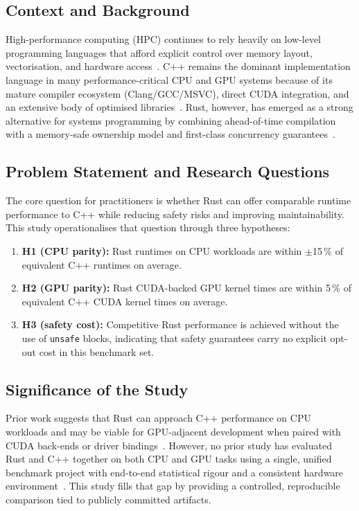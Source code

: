 \documentclass{article}
\begin{document}
\subsection{Context and Background}

High-performance computing (HPC) continues to rely heavily on low-level
programming languages that afford explicit control over memory layout,
vectorisation, and hardware access~\cite{dongarra2011international}.
C++ remains the dominant implementation language in many
performance-critical CPU and GPU systems because of its mature compiler
ecosystem (Clang/GCC/MSVC), direct CUDA integration, and an extensive body
of optimised libraries~\cite{stroustrup2007evolving}.
Rust, however, has emerged as a strong alternative for systems programming by
combining ahead-of-time compilation with a memory-safe ownership model and
first-class concurrency guarantees~\cite{jung2017rustbelt}.

\subsection{Problem Statement and Research Questions}

The core question for practitioners is whether Rust can offer comparable
runtime performance to C++ while reducing safety risks and improving
maintainability.
This study operationalises that question through three hypotheses:

\begin{enumerate}[noitemsep]
  \item \textbf{H1 (CPU parity):} Rust runtimes on CPU workloads are within
    $\pm$15\,\% of equivalent C++ runtimes on average.
  \item \textbf{H2 (GPU parity):} Rust CUDA-backed GPU kernel times are
    within 5\,\% of equivalent C++ CUDA kernel times on average.
  \item \textbf{H3 (safety cost):} Competitive Rust performance is achieved
    without the use of \texttt{unsafe} blocks, indicating that safety
    guarantees carry no explicit opt-out cost in this benchmark set.
\end{enumerate}


\subsection{Significance of the Study}

Prior work suggests that Rust can approach C++ performance on CPU workloads
and may be viable for GPU-adjacent development when paired with CUDA
back-ends or driver bindings~\cite{bychkov2022rust, ivanov2022rust,
martins2025npb}.
However, no prior study has evaluated Rust and C++ together on both CPU and
GPU tasks using a single, unified benchmark project with end-to-end
statistical rigour and a consistent hardware environment~\cite{georges2007statistically}.
This study fills that gap by providing a controlled, reproducible comparison
tied to publicly committed artifacts.
\end{document}
